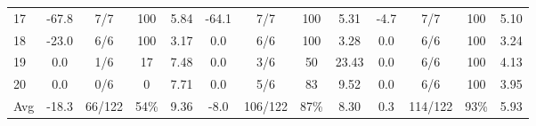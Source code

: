 \begin{table}[p]
{\begin{tabular}{l|cccc|cccc|cccc}
17 & -67.8 & 7/7 & 100 & 5.84 & -64.1 & 7/7 & 100 & 5.31 & -4.7 & 7/7 & 100 & 5.10 \\
18 & -23.0 & 6/6 & 100 & 3.17 & 0.0 & 6/6 & 100 & 3.28 & 0.0 & 6/6 & 100 & 3.24 \\
19 & 0.0 & 1/6 & 17 & 7.48 & 0.0 & 3/6 & 50 & 23.43 & 0.0 & 6/6 & 100 & 4.13 \\
20 & 0.0 & 0/6 & 0 & 7.71 & 0.0 & 5/6 & 83 & 9.52 & 0.0 & 6/6 & 100 & 3.95 \\
\midrule
Avg & -18.3 & 66/122 & 54\% & 9.36 & -8.0 & 106/122 & 87\% & 8.30 & 0.3 & 114/122 & 93\% & 5.93 \\
\bottomrule
\end{tabular}%
}
\end{table}
